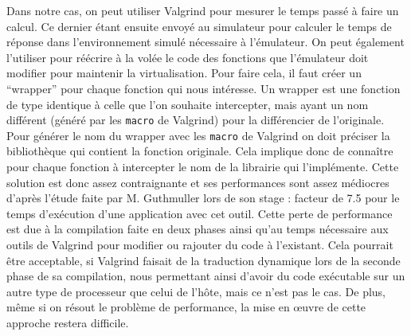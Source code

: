 Dans notre cas, on peut utiliser Valgrind pour mesurer le temps passé à faire un
calcul. Ce dernier étant ensuite envoyé au simulateur pour calculer le temps de
réponse dans l'environnement simulé nécessaire à l'émulateur. On peut
également l'utiliser pour réécrire à la volée le code des fonctions que
l'émulateur doit modifier pour maintenir la virtualisation. Pour faire cela, il
faut créer un ``wrapper'' pour chaque fonction qui nous intéresse. Un wrapper
est une fonction de type identique à celle que l'on souhaite intercepter, mais
ayant un nom différent (généré par les \texttt{macro} de Valgrind) pour la
différencier de l'originale. Pour générer le nom du wrapper avec
les \texttt{macro} de Valgrind on doit préciser la bibliothèque qui contient la
fonction originale. Cela implique donc de connaître pour chaque fonction à
intercepter le nom de la librairie qui l'implémente. Cette solution est donc
assez contraignante et ses performances sont assez médiocres d'après l'étude
faite par M. Guthmuller lors de son stage \citep{MARION:Interception}: facteur
de 7.5 pour le temps d'exécution d'une application avec cet outil. Cette perte
de performance est due à la compilation faite en deux phases ainsi qu'au temps
nécessaire aux outils de Valgrind pour modifier ou rajouter du code à
l'existant. Cela pourrait être acceptable, si Valgrind faisait de la traduction
dynamique lors de la seconde phase de sa compilation, nous permettant ainsi
d'avoir du code exécutable sur un autre type de processeur que celui de l'hôte,
mais ce n'est pas le cas. De plus, même si on résout le problème de
performance, la mise en \oe uvre de cette approche restera difficile.
